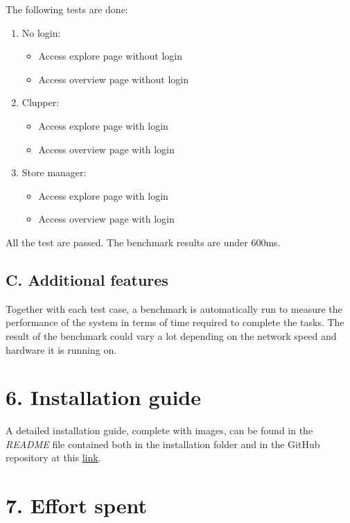 The following tests are done:
\begin{enumerate}
    \item No login:
        \begin{itemize}
            \item Access explore page without login
            \item Access overview page without login
        \end{itemize}
    \item Clupper:
        \begin{itemize}
            \item Access explore page with login
            \item Access overview page with login
        \end{itemize}
    \item Store manager:
        \begin{itemize}
            \item Access explore page with login
            \item Access overview page with login
        \end{itemize}
\end{enumerate}

All the test are passed. The benchmark results are under 600ms.

\section{C. Additional features}

Together with each test case, a benchmark is automatically run to measure the performance of the system in terms of time required to complete the tasks.
The result of the benchmark could vary a lot depending on the network speed and hardware it is running on.

\chapter{6. Installation guide}

A detailed installation guide, complete with images, can be found in the \emph{README} file contained both in the installation folder and in the GitHub repository at this \underline{\href{https://github.com/ferrohd/FerraraFratus/tree/main/CLup}{link}}.

\chapter{7. Effort spent}

